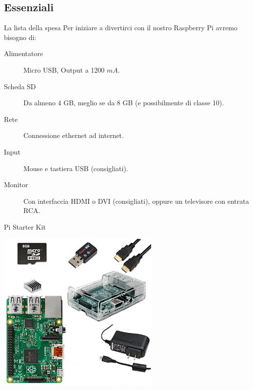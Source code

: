 \documentclass[xcolor=svgnames,11pt]{beamer}
\begin{document}
\subsection{Essenziali}
\begin{frame}{La lista della spesa}
Per iniziare a divertirci con il nostro Raspberry Pi avremo bisogno di:
\pause
\begin{description}
\item[{\color{green_raspi} Alimentatore}] Micro USB, Output a 1200 $mA$.
\pause
\item[{\color{green_raspi} Scheda SD}] Da almeno 4 GB, meglio se da 8 GB (e possibilmente di classe 10).
\pause
\item[{\color{green_raspi} Rete}] Connessione ethernet ad internet.
\pause
\item[{\color{green_raspi} Input}] Mouse e tastiera USB (consigliati).
\pause
\item[{\color{green_raspi} Monitor}] Con interfaccia HDMI o DVI (consigliati), oppure un televisore con entrata RCA.
\end{description}
\end{frame}

\begin{frame}{Pi Starter Kit}
\begin{center}
\includegraphics[width=8cm]{kit.jpg}
\end{center}
\end{frame}
\end{document}
